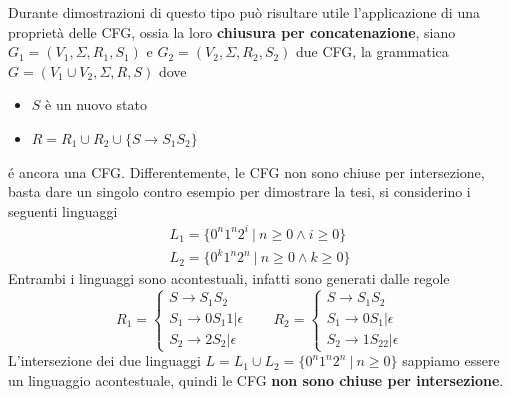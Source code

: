 \documentclass[10pt, letterpaper]{report}
\begin{document}
Durante dimostrazioni di questo tipo può risultare utile l'applicazione di una proprietà delle CFG, ossia la loro 
\textbf{chiusura per concatenazione}, siano $G_1=(V_1,\Sigma, R_1, S_1)$ e $G_2=(V_2,\Sigma, R_2, S_2)$ due CFG, la grammatica 
$G=(V_1\cup V_2,\Sigma, R, S)$ dove \begin{itemize}
    \item $S$ è un nuovo stato 
    \item $R=R_1\cup R_2\cup\{S\rightarrow S_1S_2\}$
\end{itemize}
é ancora una CFG.
\acc 
Differentemente, le CFG non sono chiuse per intersezione, basta dare un singolo contro esempio per dimostrare la tesi, si 
considerino i seguenti linguaggi 
$$ \begin{matrix}
    L_1=\{0^n1^n2^i \ | \ n\ge 0\land i\ge 0\}\\ 
    L_2=\{0^k1^n2^n \ | \ n\ge 0\land k\ge 0\}
\end{matrix}$$
Entrambi i linguaggi sono acontestuali, infatti sono generati dalle regole 
$$ R_1=\begin{cases}
    S\longrightarrow S_1S_2\\ 
    S_1\longrightarrow0S_1 1|\epsilon\\ 
    S_2 \longrightarrow 2S_2|\epsilon
\end{cases} \ \ \ \ \ \ \ \ R_2=\begin{cases}
    S\longrightarrow S_1S_2\\ 
    S_1\longrightarrow0S_1 |\epsilon\\ 
    S_2 \longrightarrow 1S_22|\epsilon
\end{cases}$$
L'intersezione dei due linguaggi $L=L_1\cup L_2 = \{0^n1^n2^n \ | \ n\ge 0\}$ sappiamo essere un linguaggio acontestuale, 
quindi le CFG \textbf{non sono chiuse per intersezione}.
\end{document}
